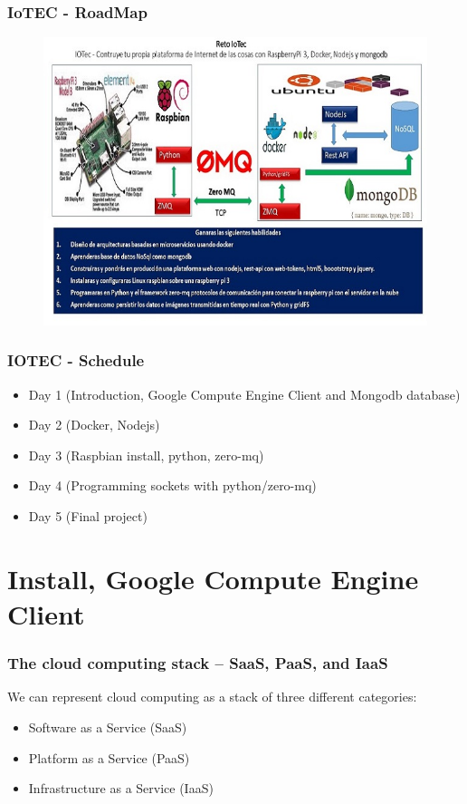 \documentclass{beamer}
\begin{document}
\begin{frame}\frametitle{IoTEC - RoadMap} 
\begin{figure}
\includegraphics[scale=0.6]{iotec_roadmap} 
\end{figure}




\end{frame}


 
\begin{frame}\frametitle{IOTEC - Schedule} 

\begin{itemize}
\item Day 1 (Introduction, Google Compute Engine Client and Mongodb database)   
\item Day 2 (Docker, Nodejs) 
\item Day 3 (Raspbian install, python, zero-mq) 
\item Day 4 (Programming sockets with python/zero-mq)
\item Day 5 (Final project)
\end{itemize} 

\end{frame}

\section{Install, Google Compute Engine Client} 
\begin{frame}\frametitle{The cloud computing stack – SaaS, PaaS, and IaaS} 

We can represent cloud computing as a stack of three different categories:
\begin{itemize}
\item Software as a Service (SaaS)   
\item Platform as a Service (PaaS) 
\item Infrastructure as a Service (IaaS)
 

\end{itemize} 



\end{frame}
\end{document}
